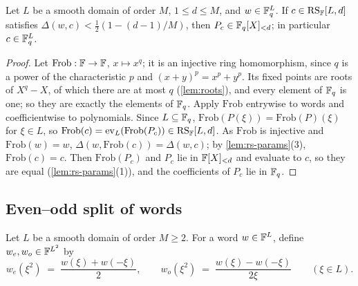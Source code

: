 \begin{lemma}\label{lem:descent}
Let $L$ be a smooth domain of order $M$, $1 \le d \le M$, and $w \in \mathbb{F}_q^L$.
If $c \in \mathrm{RS}_{\mathbb{F}}[L,d]$ satisfies $\Delta(w,c) < \tfrac12(1 - (d-1)/M)$, then $P_c \in \mathbb{F}_q[X]_{<d}$; in particular $c \in \mathbb{F}_q^L$.
\end{lemma}

\begin{proof}
Let $\mathrm{Frob} : \mathbb{F} \to \mathbb{F}$, $x \mapsto x^q$; it is an injective ring homomorphism, since $q$ is a power of the characteristic $p$ and $(x+y)^p = x^p + y^p$.
Its fixed points are roots of $X^q - X$, of which there are at most $q$ (\cref{lem:roots}), and every element of $\mathbb{F}_q$ is one; so they are exactly the elements of $\mathbb{F}_q$.
Apply $\mathrm{Frob}$ entrywise to words and coefficientwise to polynomials.
Since $L \subseteq \mathbb{F}_q$, $\mathrm{Frob}(P(\xi)) = \mathrm{Frob}(P)(\xi)$ for $\xi \in L$, so $\mathrm{Frob}(c) = \mathrm{ev}_L(\mathrm{Frob}(P_c)) \in \mathrm{RS}_{\mathbb{F}}[L,d]$.
As $\mathrm{Frob}$ is injective and $\mathrm{Frob}(w) = w$, $\Delta(w, \mathrm{Frob}(c)) = \Delta(w, c)$; by \cref{lem:rs-params}(3), $\mathrm{Frob}(c) = c$.
Then $\mathrm{Frob}(P_c)$ and $P_c$ lie in $\mathbb{F}[X]_{<d}$ and evaluate to $c$, so they are equal (\cref{lem:rs-params}(1)), and the coefficients of $P_c$ lie in $\mathbb{F}_q$.
\end{proof}

\subsection{Even--odd split of words}\label{sec:prelim:split}

Let $L$ be a smooth domain of order $M \ge 2$.
For a word $w \in \mathbb{F}^L$, define $w_e, w_o \in \mathbb{F}^{L^2}$ by
\begin{equation}\label{eq:even-odd}
  w_e(\xi^2) \;=\; \frac{w(\xi) + w(-\xi)}{2},
  \qquad
  w_o(\xi^2) \;=\; \frac{w(\xi) - w(-\xi)}{2\xi}
  \qquad (\xi \in L).
\end{equation}

